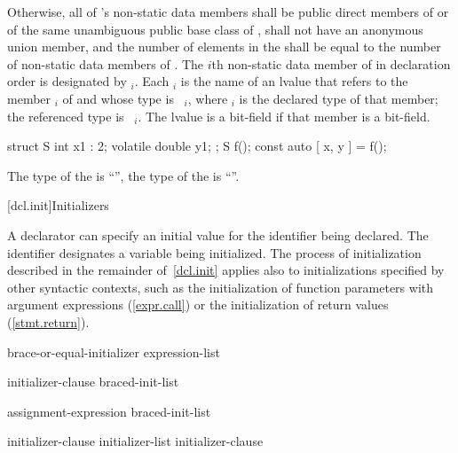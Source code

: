 \pnum
Otherwise, all of 's non-static data members shall be public direct
members of  or of the same unambiguous public base class of ,
 shall not have an anonymous union member, and the number of elements
in the  shall be equal to the number of non-static
data members of . The $i$th non-static data member of  in
declaration order is designated by $_i$. Each $_i$ is the
name of an lvalue that refers to the member $_i$ of  and
whose type is \cv\ $_i$, where $_i$ is the declared type of
that member; the referenced type is \cv\ $_i$. The lvalue is a
bit-field if that member is a bit-field.
\begin{example}
\begin{codeblock}
struct S { int x1 : 2; volatile double y1; };
S f();
const auto [ x, y ] = f();
\end{codeblock}
The type of the   is ``'',
the type of the   is ``''.
\end{example}

[dcl.init]{Initializers}%

\pnum
A declarator can specify an initial value for the
identifier being declared.
The identifier designates a variable being initialized.
The process of initialization described in the
remainder of~\ref{dcl.init}
applies also to initializations
specified by other syntactic contexts, such as the initialization
of function parameters with argument expressions (\ref{expr.call}) or
the initialization of return values (\ref{stmt.return}).

\begin{bnf}
\br
    brace-or-equal-initializer\br
    \terminal{(} expression-list \terminal{)}
\end{bnf}

\begin{bnf}
\br
    \terminal{=} initializer-clause\br
    braced-init-list
\end{bnf}

\begin{bnf}
\br
    assignment-expression\br
    braced-init-list
\end{bnf}

\begin{bnf}
\br
    initializer-clause \opt\br
    initializer-list \terminal{,} initializer-clause \opt
\end{bnf}

